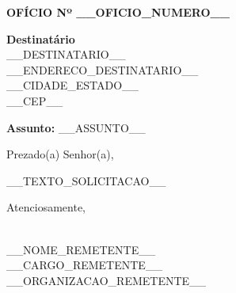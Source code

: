 \documentclass{article}
\begin{document}
\begin{center}
    \textbf{OFÍCIO Nº __OFICIO_NUMERO__}
\end{center}

\vspace{1cm}

\begin{flushright}
    \textbf{Destinatário} \\
    __DESTINATARIO__ \\
    __ENDERECO_DESTINATARIO__ \\
    __CIDADE_ESTADO__ \\
    __CEP__
\end{flushright}

\vspace{1cm}

\textbf{Assunto:} __ASSUNTO__

\vspace{1cm}

Prezado(a) Senhor(a),

\bigskip

__TEXTO_SOLICITACAO__

\bigskip

Atenciosamente,

\vspace{1cm}

\hrulefill \\
__NOME_REMETENTE__ \\
__CARGO_REMETENTE__ \\
__ORGANIZACAO_REMETENTE__ \\
\end{document}
